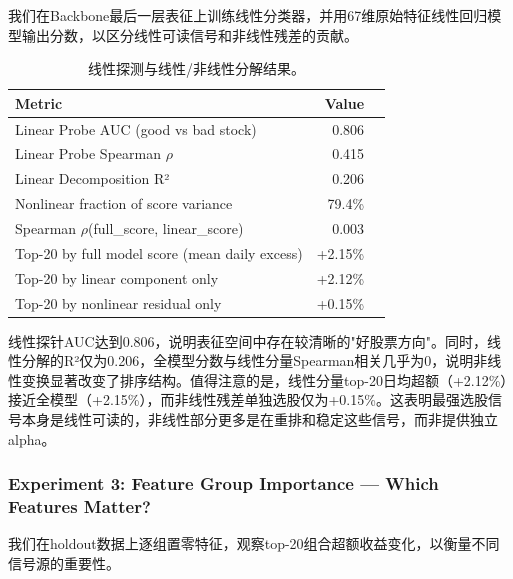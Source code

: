 我们在Backbone最后一层表征上训练线性分类器，并用67维原始特征线性回归模型输出分数，以区分线性可读信号和非线性残差的贡献。

\begin{table}[H]
\centering
\caption{线性探测与线性/非线性分解结果。}
\label{tab:rq3_probe}
\begin{tabular}{@{}lrr@{}}
\toprule
Metric & Value \\
\midrule
Linear Probe AUC (good vs bad stock) & 0.806 \\
Linear Probe Spearman $\rho$ & 0.415 \\
\midrule
Linear Decomposition R² & 0.206 \\
Nonlinear fraction of score variance & 79.4\% \\
Spearman $\rho$(full\_score, linear\_score) & 0.003 \\
\midrule
Top-20 by full model score (mean daily excess) & +2.15\% \\
Top-20 by linear component only & +2.12\% \\
Top-20 by nonlinear residual only & +0.15\% \\
\bottomrule
\end{tabular}
\end{table}

线性探针AUC达到0.806，说明表征空间中存在较清晰的"好股票方向"。同时，线性分解的R²仅为0.206，全模型分数与线性分量Spearman相关几乎为0，说明非线性变换显著改变了排序结构。值得注意的是，线性分量top-20日均超额（+2.12\%）接近全模型（+2.15\%），而非线性残差单独选股仅为+0.15\%。这表明最强选股信号本身是线性可读的，非线性部分更多是在重排和稳定这些信号，而非提供独立alpha。

\subsubsection{Experiment 3: Feature Group Importance — Which Features Matter?}

我们在holdout数据上逐组置零特征，观察top-20组合超额收益变化，以衡量不同信号源的重要性。

